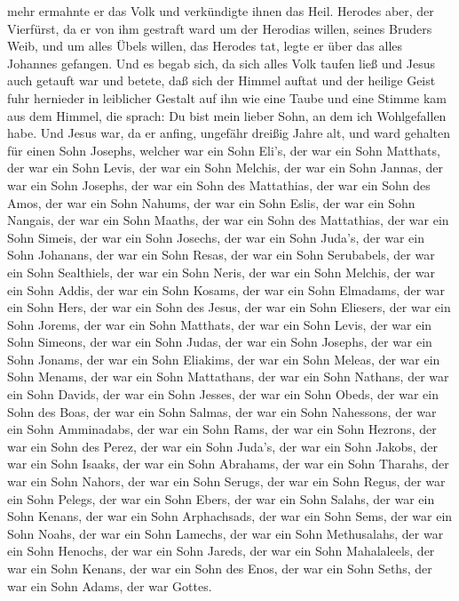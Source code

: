 mehr ermahnte er das Volk und verkündigte ihnen das Heil. 
Herodes aber, der Vierfürst, da er von ihm gestraft ward um der Herodias
willen, seines Bruders Weib, und um alles Übels willen, das Herodes tat,
 legte er über das alles Johannes gefangen. 
Und es begab sich, da sich alles Volk taufen ließ und Jesus auch getauft
war und betete, daß sich der Himmel auftat  und der heilige
Geist fuhr hernieder in leiblicher Gestalt auf ihn wie eine Taube und
eine Stimme kam aus dem Himmel, die sprach: Du bist mein lieber Sohn, an
dem ich Wohlgefallen habe.  Und Jesus war, da er anfing,
ungefähr dreißig Jahre alt, und ward gehalten für einen Sohn Josephs,
welcher war ein Sohn Eli's,  der war ein Sohn Matthats, der
war ein Sohn Levis, der war ein Sohn Melchis, der war ein Sohn Jannas,
der war ein Sohn Josephs,  der war ein Sohn des Mattathias,
der war ein Sohn des Amos, der war ein Sohn Nahums, der war ein Sohn
Eslis, der war ein Sohn Nangais,  der war ein Sohn Maaths,
der war ein Sohn des Mattathias, der war ein Sohn Simeis, der war ein
Sohn Josechs, der war ein Sohn Juda's,  der war ein Sohn
Johanans, der war ein Sohn Resas, der war ein Sohn Serubabels, der war
ein Sohn Sealthiels, der war ein Sohn Neris,  der war ein
Sohn Melchis, der war ein Sohn Addis, der war ein Sohn Kosams, der war
ein Sohn Elmadams, der war ein Sohn Hers,  der war ein Sohn
des Jesus, der war ein Sohn Eliesers, der war ein Sohn Jorems, der war
ein Sohn Matthats, der war ein Sohn Levis,  der war ein
Sohn Simeons, der war ein Sohn Judas, der war ein Sohn Josephs, der war
ein Sohn Jonams, der war ein Sohn Eliakims,  der war ein
Sohn Meleas, der war ein Sohn Menams, der war ein Sohn Mattathans, der
war ein Sohn Nathans, der war ein Sohn Davids,  der war ein
Sohn Jesses, der war ein Sohn Obeds, der war ein Sohn des Boas, der war
ein Sohn Salmas, der war ein Sohn Nahessons,  der war ein
Sohn Amminadabs, der war ein Sohn Rams, der war ein Sohn Hezrons, der
war ein Sohn des Perez, der war ein Sohn Juda's,  der war
ein Sohn Jakobs, der war ein Sohn Isaaks, der war ein Sohn Abrahams, der
war ein Sohn Tharahs, der war ein Sohn Nahors,  der war ein
Sohn Serugs, der war ein Sohn Regus, der war ein Sohn Pelegs, der war
ein Sohn Ebers, der war ein Sohn Salahs,  der war ein Sohn
Kenans, der war ein Sohn Arphachsads, der war ein Sohn Sems, der war ein
Sohn Noahs, der war ein Sohn Lamechs,  der war ein Sohn
Methusalahs, der war ein Sohn Henochs, der war ein Sohn Jareds, der war
ein Sohn Mahalaleels, der war ein Sohn Kenans,  der war ein
Sohn des Enos, der war ein Sohn Seths, der war ein Sohn Adams, der war
Gottes.


